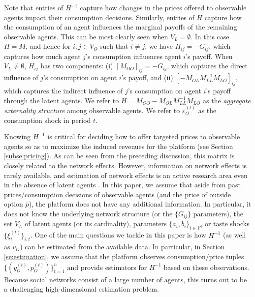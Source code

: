 \documentclass[opre,nonblindrev]{informs3} %
\begin{document}
Note that entries of $H^{-1}$ capture how changes in the prices offered to observable  agents impact their consumption decisions.
Similarly, entries of $H$ capture how the consumption of an agent influences the marginal payoffs of the remaining observable agents. This can be most clearly seen when $V_L=\emptyset$. In this case $H=M$,  and hence
for $i,j\in V_O$ such that $i\neq j$, we have
$H_{ij}=-G_{ij}$, which captures  how much agent $j$'s consumption  influences agent $i$'s payoff. When $V_L\neq \emptyset$, $H_{ij}$
has two components: (i) $[ M_{OO}]_{ij}=-G_{ij}$, which captures the direct influence of $j$'s consumption on agent $i$'s payoff, and (ii)
$[-M_{OL}M_{LL}^{-1}M_{LO}]_{ij} $, which captures the indirect influence of $j$'s consumption on agent $i$'s payoff through the latent agents.
We refer to $H=M_{OO}-M_{OL}M_{LL}^{-1}M_{LO}$ as the \emph{aggregate externality structure}  among observable agents.
We refer to $\varepsilon_O^{(t)}$ as the consumption shock in period $t$.


Knowing  $H^{-1}$ is critical
for deciding how to offer targeted prices to observable agents so as to maximize the induced revenues for the platform (see Section \ref{subse:pricing}).
As can be seen from the preceding discussion, this matrix is closely related to the network effects.
However,
information on
network effects
is rarely available, and estimation of network effects is an active research area even in the absence of latent agents 
\citep[see, e.g.,][]{bramoulle2009identification,calvo2009peer,manresa2013estimating}.
In this paper,
we assume that
aside from past prices/consumption decisions of observable agents (and the price of outside option $\bar p$),
the platform does not have any additional information. In particular, it does not know the underlying network structure (or the $\{G_{ij}\}$ parameters), the set $V_L$ of latent agents (or its cardinality),  parameters $\{a_i,b_i\}_{i\in V}$, or taste shocks $\{\xi_i^{(t)}\}_{i,t}$.
One of the main questions we tackle in this paper is how $H^{-1}$  (as well as   ${v}_O$) can be estimated from the available data.
In particular, in Section \ref{se:estimation},
we assume that the platform observes consumption/price tuples $\{({y}_O^{(t)},{p}_O^{(t)})\}_{t=1}^n$
and provide estimators for   $H^{-1}$ based on these observations.
Because social networks consist of a large number of agents, this turns out to be a challenging high-dimensional estimation problem.
\end{document}
